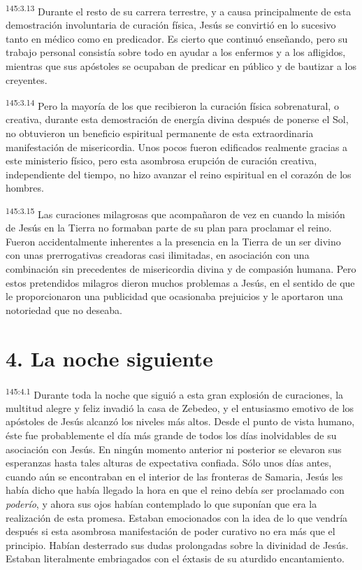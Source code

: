 \par 
\textsuperscript{145:3.13} Durante el resto de su carrera terrestre, y a causa principalmente de esta demostración involuntaria de curación física, Jesús se convirtió en lo sucesivo tanto en médico como en predicador. Es cierto que continuó enseñando, pero su trabajo personal consistía sobre todo en ayudar a los enfermos y a los afligidos, mientras que sus apóstoles se ocupaban de predicar en público y de bautizar a los creyentes.

\par 
\textsuperscript{145:3.14} Pero la mayoría de los que recibieron la curación física sobrenatural, o creativa, durante esta demostración de energía divina después de ponerse el Sol, no obtuvieron un beneficio espiritual permanente de esta extraordinaria manifestación de misericordia. Unos pocos fueron edificados realmente gracias a este ministerio físico, pero esta asombrosa erupción de curación creativa, independiente del tiempo, no hizo avanzar el reino espiritual en el corazón de los hombres.

\par 
\textsuperscript{145:3.15} Las curaciones milagrosas que acompañaron de vez en cuando la misión de Jesús en la Tierra no formaban parte de su plan para proclamar el reino. Fueron accidentalmente inherentes a la presencia en la Tierra de un ser divino con unas prerrogativas creadoras casi ilimitadas, en asociación con una combinación sin precedentes de misericordia divina y de compasión humana. Pero estos pretendidos milagros dieron muchos problemas a Jesús, en el sentido de que le proporcionaron una publicidad que ocasionaba prejuicios y le aportaron una notoriedad que no deseaba.

\section*{4. La noche siguiente}
\par 
\textsuperscript{145:4.1} Durante toda la noche que siguió a esta gran explosión de curaciones, la multitud alegre y feliz invadió la casa de Zebedeo, y el entusiasmo emotivo de los apóstoles de Jesús alcanzó los niveles más altos. Desde el punto de vista humano, éste fue probablemente el día más grande de todos los días inolvidables de su asociación con Jesús. En ningún momento anterior ni posterior se elevaron sus esperanzas hasta tales alturas de expectativa confiada. Sólo unos días antes, cuando aún se encontraban en el interior de las fronteras de Samaria, Jesús les había dicho que había llegado la hora en que el reino debía ser proclamado con \textit{poderío}, y ahora sus ojos habían contemplado lo que suponían que era la realización de esta promesa. Estaban emocionados con la idea de lo que vendría después si esta asombrosa manifestación de poder curativo no era más que el principio. Habían desterrado sus dudas prolongadas sobre la divinidad de Jesús. Estaban literalmente embriagados con el éxtasis de su aturdido encantamiento.

